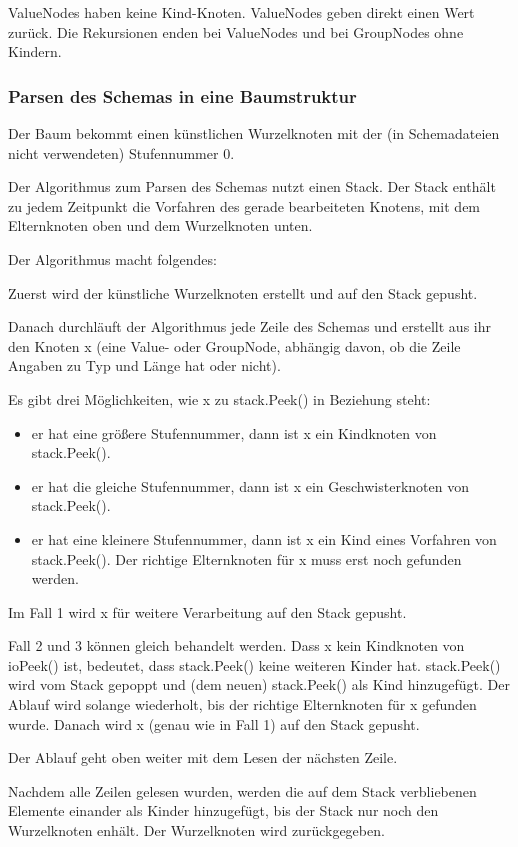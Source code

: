 {ValueNodes haben keine Kind-Knoten. ValueNodes geben direkt einen Wert zurück.
Die Rekursionen enden bei ValueNodes und bei GroupNodes ohne Kindern.

\subsubsection{Parsen des Schemas in eine Baumstruktur}
Der Baum bekommt einen künstlichen Wurzelknoten mit der (in Schemadateien nicht verwendeten) Stufennummer 0.

Der Algorithmus zum Parsen des Schemas nutzt einen Stack. Der Stack enthält zu jedem Zeitpunkt die Vorfahren des gerade bearbeiteten Knotens, mit dem Elternknoten oben und dem Wurzelknoten unten.

Der Algorithmus macht folgendes:

Zuerst wird der künstliche Wurzelknoten erstellt und auf den Stack gepusht.

Danach durchläuft der Algorithmus jede Zeile des Schemas und erstellt aus ihr den Knoten x (eine Value- oder GroupNode, abhängig davon, ob die Zeile Angaben zu Typ und Länge hat oder nicht).


Es gibt drei Möglichkeiten, wie x zu stack.Peek() in Beziehung steht:
\begin{itemize}
\item er hat eine größere Stufennummer, dann ist x ein Kindknoten von stack.Peek().
\item er hat die gleiche Stufennummer, dann ist x ein Geschwisterknoten von stack.Peek().
\item er hat eine kleinere Stufennummer, dann ist x ein Kind eines Vorfahren von stack.Peek(). Der richtige Elternknoten für x muss erst noch gefunden werden.
\end{itemize}
Im Fall 1 wird x für weitere Verarbeitung auf den Stack gepusht.


Fall 2 und 3 können gleich behandelt werden. Dass x kein Kindknoten von ioPeek() ist, bedeutet, dass stack.Peek() keine weiteren Kinder hat. stack.Peek() wird vom Stack gepoppt und (dem neuen) stack.Peek() als Kind hinzugefügt. Der Ablauf wird solange wiederholt, bis der richtige Elternknoten für x gefunden wurde.
Danach wird x (genau wie in Fall 1) auf den Stack gepusht.

Der Ablauf geht oben weiter mit dem Lesen der nächsten Zeile.


Nachdem alle Zeilen gelesen wurden, werden die auf dem Stack verbliebenen Elemente einander als Kinder hinzugefügt, bis der Stack nur noch den Wurzelknoten enhält. Der Wurzelknoten wird zurückgegeben.


}
